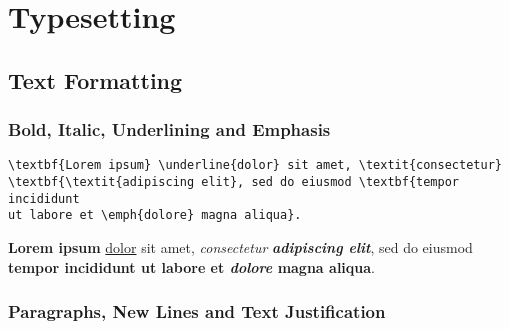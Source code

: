 \chapter*{Typesetting}%
\label{ch:typesetting}

\section*{Text Formatting}%
\label{sec:text-formatting}

\subsection*{Bold, Italic, Underlining and Emphasis}%
\label{subsec:bold-italic-underlining-and-emphasis}

\begin{lstlisting}[caption={Bold, italic, underlining and emphasis.}]
\textbf{Lorem ipsum} \underline{dolor} sit amet, \textit{consectetur}
\textbf{\textit{adipiscing elit}, sed do eiusmod \textbf{tempor incididunt
ut labore et \emph{dolore} magna aliqua}.
\end{lstlisting}

\textbf{Lorem ipsum} \underline{dolor} sit amet, \textit{consectetur}
\textbf{\textit{adipiscing elit}}, sed do eiusmod \textbf{tempor incididunt
ut labore et \emph{dolore} magna aliqua}.

\subsection*{Paragraphs, New Lines and Text Justification}%
\label{subsec:paragraphs-new-lines-and-text-justification}

